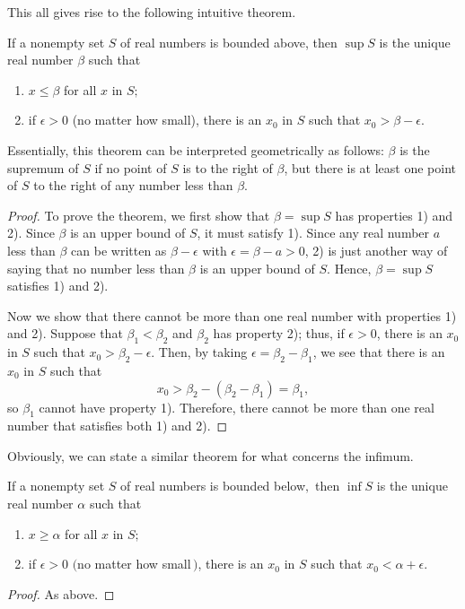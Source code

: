 	This all gives rise to the following intuitive theorem. 
	
	\begin{theorem}[Supremum]\label{thmtype:1.1.3}
		If a nonempty set $S$ of real numbers  is bounded above, then
		$\sup S$ is the unique real number $\beta$ such that
		\begin{enumerate}
			\item  $x\leq\beta$ for all $x$ in $S;$
			\item  if $\epsilon>0$ (no matter how small), there is an $x_0$ in
			$S$ such that $x_0>\beta-\epsilon.$
		\end{enumerate}
	\end{theorem}
	Essentially, this theorem can be  interpreted geometrically as follows: $\beta$ is the supremum of $S$ if no point of $S$ is to the right of $\beta$, but there is at least one point of $S$ to the right of any number less than $\beta$. 
	
	\begin{proof}
	To prove the theorem, we first show that $\beta=\sup S$ has properties 1) and
	2). Since $\beta$ is an upper bound of $S$, it must satisfy
	1). Since any real number $a$ less than $\beta$ can be written
	as $\beta-\epsilon$ with $\epsilon=\beta-a>0$, 2) is just
	another way of saying that no number less than $\beta$ is an upper
	bound of $S$. Hence, $\beta=\sup S$ satisfies 1) and 2).
	
	Now we show that there cannot be more than one real number with
	properties 1) and 2). Suppose that $\beta_1<\beta_2$ and
	$\beta_2$ has property 2); thus, if $\epsilon>0$, there is an
	$x_0$ in $S$ such that $x_0>\beta_2-\epsilon$. Then, by taking
	$\epsilon=\beta_2-\beta_1$, we see that there is an $x_0$ in $S$ such
	that
	$$
	x_0>\beta_2-(\beta_2-\beta_1)=\beta_1,
	$$
	so  $\beta_1$ cannot have property 1). Therefore, there cannot
	be more than one real number that satisfies both 1) and
	2).
	\end{proof}
	
	Obviously, we can state a similar theorem for what concerns the infimum.
	\\
	
	\begin{theorem}[Infimum]\label{thmtype:1.1.8}
		If a nonempty set $S$ of real numbers  is bounded below$,$ then
		$\inf S$ is the unique real number $\alpha$ such that
		\begin{enumerate}
			\item %
			$x\ge\alpha$ for all $x$ in $S;$
			\item %
			if $\epsilon>0$ $($no matter how small$\,)$, there is an $x_0$ in $S$
			such that
			$x_0<
			\alpha+\epsilon.$
		\end{enumerate}
	\end{theorem}
 \begin{proof}
 As above.
 \end{proof}
	
